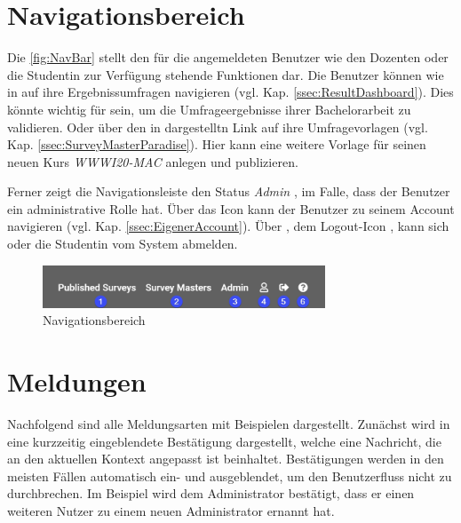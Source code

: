 \section{Navigationsbereich}
\label{ssec:NavBar}

Die \abb \vref{fig:NavBar} stellt den für die angemeldeten Benutzer wie \zb den Dozenten \duzi oder die Studentin \ariane zur Verfügung stehende Funktionen dar. 
Die Benutzer können wie in \desOne auf ihre Ergebnissumfragen navigieren (vgl. Kap. \vref{ssec:ResultDashboard}). 
Dies könnte \ua wichtig für \ariane sein, um die Umfrageergebnisse ihrer Bachelorarbeit zu validieren. 
Oder über den in \desTwo dargestelltn Link auf ihre Umfragevorlagen (vgl. Kap. \vref{ssec:SurveyMasterParadise}). 
Hier kann \zb \duzi eine weitere Vorlage für seinen neuen Kurs \emph{WWWI20-MAC} anlegen und publizieren. 
 
Ferner zeigt die Navigationsleiste den Status \emph{Admin} \desThree, im Falle, dass der Benutzer ein administrative Rolle hat. \newline
Über das Icon \faUser[regular]\xspace \desFour kann der Benutzer zu seinem Account navigieren (vgl. Kap. \vref{ssec:EigenerAccount}). \newline
Über \desFive, dem Logout-Icon \faSignOut*\xspace, kann sich \duzi oder die Studentin \ariane vom System abmelden. 

\begin{figure}[H]
	\centering
	\includegraphics[width=0.75\textwidth, keepaspectratio]{img/guide/NavBar.png}
	\captionsetup{justification=centering, format=plain}
	\caption[Navigationsbereich]{Navigationsbereich \\\quelleScreenshot}
	\label{fig:NavBar}
\end{figure}

\section{Meldungen}
\label{ssec:Meldungen}

Nachfolgend sind alle Meldungsarten mit Beispielen dargestellt.
Zunächst wird in  eine kurzzeitig eingeblendete Bestätigung dargestellt, welche eine Nachricht, die an den aktuellen Kontext angepasst ist beinhaltet.
Bestätigungen werden in den meisten Fällen automatisch ein- und ausgeblendet, um den Benutzerfluss nicht zu durchbrechen.
Im Beispiel wird dem Administrator bestätigt, dass er einen weiteren Nutzer zu einem neuen Administrator ernannt hat.

